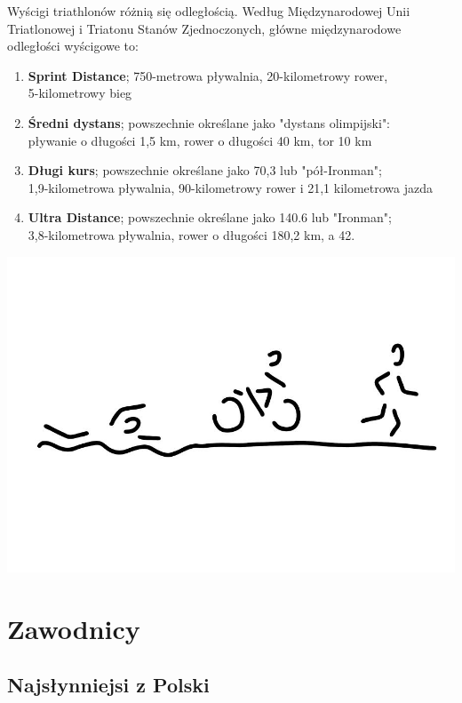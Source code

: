 \documentclass[12pt]{article}
\begin{document}
Wyścigi triathlonów różnią się odległością. Według Międzynarodowej Unii Triatlonowej i Triatonu Stanów Zjednoczonych, główne międzynarodowe odległości wyścigowe to:
\begin{enumerate}

\item \textbf{Sprint Distance}; 750-metrowa pływalnia, 20-kilometrowy rower,\\ 5-kilometrowy bieg
\item \textbf{Średni dystans}; powszechnie określane jako "dystans olimpijski":\\ pływanie o długości 1,5 km, rower o długości 40 km, tor 10 km
\item \textbf{Długi kurs}; powszechnie określane jako 70,3 lub "pół-Ironman";\\ 1,9-kilometrowa pływalnia, 90-kilometrowy rower i 21,1 kilometrowa jazda
\item \textbf{Ultra Distance}; powszechnie określane jako 140.6 lub "Ironman";\\ 3,8-kilometrowa pływalnia, rower o długości 180,2 km, a 42.
\end{enumerate}
\begin{center}
\includegraphics[width=0.28 \paperwidth]{dwa.jpg}
\end{center}

\section{Zawodnicy}
\subsection{Najsłynniejsi z Polski}
\end{document}
